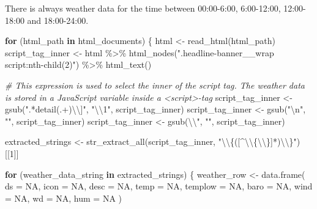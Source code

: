 \documentclass[
]{article}
\newenvironment{Shaded}{\begin{snugshade}}{\end{snugshade}}
\newcommand{\AttributeTok}[1]{\textcolor[rgb]{0.77,0.63,0.00}{#1}}
\newcommand{\CommentTok}[1]{\textcolor[rgb]{0.56,0.35,0.01}{\textit{#1}}}
\newcommand{\ConstantTok}[1]{\textcolor[rgb]{0.00,0.00,0.00}{#1}}
\newcommand{\ControlFlowTok}[1]{\textcolor[rgb]{0.13,0.29,0.53}{\textbf{#1}}}
\newcommand{\DecValTok}[1]{\textcolor[rgb]{0.00,0.00,0.81}{#1}}
\newcommand{\FunctionTok}[1]{\textcolor[rgb]{0.00,0.00,0.00}{#1}}
\newcommand{\NormalTok}[1]{#1}
\newcommand{\OtherTok}[1]{\textcolor[rgb]{0.56,0.35,0.01}{#1}}
\newcommand{\SpecialCharTok}[1]{\textcolor[rgb]{0.00,0.00,0.00}{#1}}
\newcommand{\StringTok}[1]{\textcolor[rgb]{0.31,0.60,0.02}{#1}}
\begin{document}
There is always weather data for the time between 00:00-6:00,
6:00-12:00, 12:00-18:00 and 18:00-24:00.

\begin{Shaded}
\begin{Highlighting}[]
\ControlFlowTok{for}\NormalTok{ (html\_path }\ControlFlowTok{in}\NormalTok{ html\_documents) \{}
\NormalTok{  html }\OtherTok{\textless{}{-}} \FunctionTok{read\_html}\NormalTok{(html\_path)}
\NormalTok{  script\_tag\_inner }\OtherTok{\textless{}{-}}\NormalTok{ html }\SpecialCharTok{\%\textgreater{}\%} \FunctionTok{html\_nodes}\NormalTok{(}\StringTok{".headline{-}banner\_\_wrap script:nth{-}child(2)"}\NormalTok{) }\SpecialCharTok{\%\textgreater{}\%} \FunctionTok{html\_text}\NormalTok{()}
  
  \CommentTok{\# This expression is used to select the inner of the script tag. The weather data is stored in a JavaScript variable inside a \textless{}script\textgreater{}{-}tag}
\NormalTok{  script\_tag\_inner }\OtherTok{\textless{}{-}} \FunctionTok{gsub}\NormalTok{(}\StringTok{".*detail(.+)}\SpecialCharTok{\textbackslash{}\textbackslash{}}\StringTok{]"}\NormalTok{, }\StringTok{"}\SpecialCharTok{\textbackslash{}\textbackslash{}}\StringTok{1"}\NormalTok{, script\_tag\_inner)}
\NormalTok{  script\_tag\_inner }\OtherTok{\textless{}{-}} \FunctionTok{gsub}\NormalTok{(}\StringTok{"}\SpecialCharTok{\textbackslash{}n}\StringTok{"}\NormalTok{, }\StringTok{""}\NormalTok{, script\_tag\_inner)}
\NormalTok{  script\_tag\_inner }\OtherTok{\textless{}{-}} \FunctionTok{gsub}\NormalTok{(}\StringTok{\textquotesingle{}}\SpecialCharTok{\textbackslash{}\textbackslash{}}\StringTok{"\textquotesingle{}}\NormalTok{, }\StringTok{"\textquotesingle{}"}\NormalTok{, script\_tag\_inner)}
  
\NormalTok{  extracted\_strings }\OtherTok{\textless{}{-}} \FunctionTok{str\_extract\_all}\NormalTok{(script\_tag\_inner, }\StringTok{"}\SpecialCharTok{\textbackslash{}\textbackslash{}}\StringTok{\{([\^{}}\SpecialCharTok{\textbackslash{}\textbackslash{}}\StringTok{\{}\SpecialCharTok{\textbackslash{}\textbackslash{}}\StringTok{\}]*)}\SpecialCharTok{\textbackslash{}\textbackslash{}}\StringTok{\}"}\NormalTok{)[[}\DecValTok{1}\NormalTok{]]}

  \ControlFlowTok{for}\NormalTok{ (weather\_data\_string }\ControlFlowTok{in}\NormalTok{ extracted\_strings) \{}
\NormalTok{    weather\_row }\OtherTok{\textless{}{-}} \FunctionTok{data.frame}\NormalTok{(}
      \AttributeTok{ds =} \ConstantTok{NA}\NormalTok{,}
      \AttributeTok{icon =} \ConstantTok{NA}\NormalTok{,}
      \AttributeTok{desc =} \ConstantTok{NA}\NormalTok{,}
      \AttributeTok{temp =} \ConstantTok{NA}\NormalTok{,}
      \AttributeTok{templow =} \ConstantTok{NA}\NormalTok{,}
      \AttributeTok{baro =} \ConstantTok{NA}\NormalTok{,}
      \AttributeTok{wind =} \ConstantTok{NA}\NormalTok{,}
      \AttributeTok{wd =} \ConstantTok{NA}\NormalTok{,}
      \AttributeTok{hum =} \ConstantTok{NA}
\NormalTok{    )}
    

\end{Highlighting}
\end{Shaded}
\end{document}
